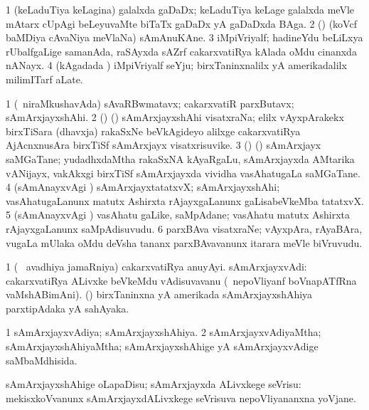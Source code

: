 \bentry
{}
\gl{\nA}
\bmng
\bnum
\num{1} (keLaduTiya keLagina) galalxda gaDaDx; keLaduTiya keLage galalxda meVle mAtarx cUpAgi beLeyuvaMte biTaTx gaDaDx yA gaDaDxda BAga. 
\num{2} (\pArxparx) (koVcf baMDiya cAvaNiya meVlaNa) sAmAnuKAne.   
\num{3} iMpiVriyalf; hadineYdu beLiLxya rUbalfgaLige samanAda, raSAyxda sAZrf cakarxvatiRya kAlada oMdu cinanxda nANayx. 
\num{4} (kAgadada \vi) iMpiVriyalf seYju; birxTaninxnalilx  yA amerikadalilx  milimITarf aLate. 
\enum
\emng
\eentry

\bentry
{}
\gl{\nA}
\bmng
\bnum
\num{1} (\kanmu\ niraMkushavAda) sAvaRBwmatavx; cakarxvatiR parxButavx; sAmArxjayxshAhi. 
\num{2} (\birx) (\ca) sAmArxjayxshAhi visatxraNa; elilx vAyxpArakekx birxTiSara (dhavxja) rakaSxNe beVkAgideyo alilxge cakarxvatiRya AjAcnxnusAra birxTiSf sAmArxjayx visatxrisuvike. 
\num{3} (\birx) (\ca) sAmArxjayx saMGaTane; yudadhxdaMtha rakaSxNA kAyaRgaLu, sAmArxjayxda AMtarika vANijayx, \mo vakAkxgi birxTiSf sAmArxjayxda vividha vasAhatugaLa saMGaTane. 
\num{4} (sAmAnayxvAgi \hiV) sAmArxjayxtatatxvX; sAmArxjayxshAhi; vasAhatugaLanunx matutx Ashirxta rAjayxgaLanunx gaLisabeVkeMba tatatxvX. 
\num{5} (sAmAnayxvAgi \hiV) vasAhatu gaLike, saMpAdane; vasAhatu matutx Ashirxta rAjayxgaLanunx saMpAdisuvudu. 
\num{6} parxBAva visatxraNe; vAyxpAra, rAyaBAra, \mo vugaLa mUlaka oMdu deVsha tananx parxBAvavanunx itarara meVle biVruvudu. 
\enum
\emng
\eentry

\bentry
{}
\gl{\nA}
\bmng
\bnum
\num{1} (\kanmu\  avadhiya jamaRniya) cakarxvatiRya anuyAyi. 
 sAmArxjayxvAdi: 
\banum
{} cakarxvatiRya ALivxke beVkeMdu vAdisuvavanu (\kanmu\ nepoVliyanf boVnapATfRna vaMshABimAni). 
 (\kanmu) birxTaninxna yA amerikada sAmArxjayxshAhiya parxtipAdaka yA sahAyaka. 
\eanum
\numie
\enum
\emng
\eentry

\bentry
{}
\gl{\gu}
\bmng
\bnum
\num{1} sAmArxjayxvAdiya; sAmArxjayxshAhiya. 
\num{2} sAmArxjayxvAdiyaMtha; sAmArxjayxshAhiyaMtha; sAmArxjayxshAhige yA sAmArxjayxvAdige saMbaMdhisida. 
\enum
\emng
\eentry

\bentry
{}
\gl{\sakirx}
\bmng
sAmArxjayxshAhige oLapaDisu; sAmArxjayxda ALivxkege seVrisu:  mekisxkoVvanunx sAmArxjayxdALivxkege seVrisuva nepoVliyananxna yoVjane. 
\emng
\eentry

